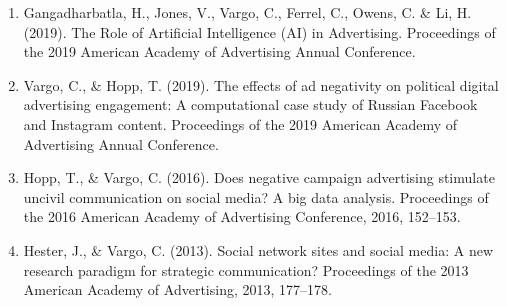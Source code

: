 \documentclass[11pt,letterpaper]{article}
\begin{document}
{\begin{enumerate}
\item Gangadharbatla, H., Jones, V., Vargo, C., Ferrel, C., Owens, C. \& Li, H. (2019). The Role of Artificial Intelligence (AI) in Advertising. Proceedings of the 2019 American Academy of Advertising Annual Conference.
\item Vargo, C., \& Hopp, T. (2019). The effects of ad negativity on political digital advertising engagement: A computational case study of Russian Facebook and Instagram content. Proceedings of the 2019 American Academy of Advertising Annual Conference.
\item Hopp, T., \& Vargo, C. (2016). Does negative campaign advertising stimulate uncivil communication on social media? A big data analysis. Proceedings of the 2016 American Academy of Advertising Conference, 2016, 152--153.
\item Hester, J., \& Vargo, C. (2013). Social network sites and social media: A new research paradigm for strategic communication? Proceedings of the 2013 American Academy of Advertising, 2013, 177--178.
\end{enumerate}
}
\end{document}

